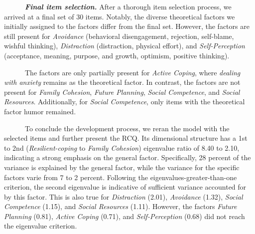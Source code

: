 \documentclass[
  man,floatsintext]{apa7}
\begin{document}
~~~~~~\textbf{\emph{Final item selection.}} After a thorough item selection process, we arrived at a final set of 30 items. Notably, the diverse theoretical factors we initially assigned to the factors differ from the final set. However, the factors are still present for \emph{Avoidance} (behavioral disengagement, rejection, self-blame, wishful thinking), \emph{Distraction} (distraction, physical effort), and \emph{Self-Perception} (acceptance, meaning, purpose, and growth, optimism, positive thinking).

~~~~~~The factors are only partially present for \emph{Active Coping}, where \emph{dealing with anxiety} remains as the theoretical factor. In contrast, the factors are not present for \emph{Family Cohesion}, \emph{Future Planning}, \emph{Social Competence}, and \emph{Social Resources}. Additionally, for \emph{Social Competence}, only items with the theoretical factor humor remained.

~~~~~~To conclude the development process, we reran the model with the selected items and further present the RCQ. Its dimensional structure has a 1st to 2nd (\emph{Resilient-coping} to \emph{Family Cohesion}) eigenvalue ratio of 8.40 to 2.10, indicating a strong emphasis on the general factor. Specifically, 28 percent of the variance is explained by the general factor, while the variance for the specific factors varie from 7 to 2 percent. Following the eigenvalues-greater-than-one criterion, the second eigenvalue is indicative of sufficient variance accounted for by this factor. This is also true for \emph{Distraction} (2.01), \emph{Avoidance} (1.32), \emph{Social Competence} (1.15), and \emph{Social Resources} (1.11). However, the factors \emph{Future Planning} (0.81), \emph{Active Coping} (0.71), and \emph{Self-Perception} (0.68) did not reach the eigenvalue criterion.

\newpage
{}

\label{table1}
\end{document}

